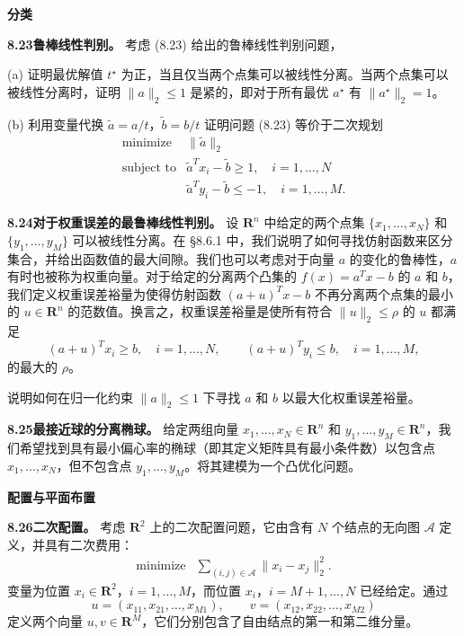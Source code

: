 \documentclass[UTF8, 12pt, fontset=fandol, oneside]{ctexart}
\begin{document}
\noindent\textbf{分类}

\noindent\textbf{8.23\quad 鲁棒线性判别。}
考虑 (8.23) 给出的鲁棒线性判别问题，

(a) 证明最优解值 $t^\star$ 为正，当且仅当两个点集可以被线性分离。当两个点集可以被线性分离时，证明 $\|a\|_2\leq 1$ 是紧的，即对于所有最优 $a^\star$ 有 $\|a^\star\|_2=1$。

(b) 利用变量代换 $\tilde a=a/t$，$\tilde b=b/t$ 证明问题 (8.23) 等价于二次规划
\[
\begin{array}{ll}
\mbox{minimize} & \|\tilde a\|_2\\
\mbox{subject to} & \tilde a^Tx_i-\tilde b\geq 1,\quad i=1,\ldots,N\\
& \tilde a^Ty_i-\tilde b\leq -1,\quad i=1,\ldots,M.
\end{array}
\]

\noindent\textbf{8.24\quad 对于权重误差的最鲁棒线性判别。}
设 $\mathbf{R}^n$ 中给定的两个点集 $\{x_1,\ldots,x_N\}$ 和 $\{y_1,\ldots,y_M\}$ 可以被线性分离。在 \S 8.6.1 中，我们说明了如何寻找仿射函数来区分集合，并给出函数值的最大间隙。我们也可以考虑对于向量 $a$ 的变化的鲁棒性，$a$ 有时也被称为权重向量。对于给定的分离两个凸集的 $f(x)=a^Tx-b$ 的 $a$ 和 $b$，我们定义权重误差裕量为使得仿射函数 $(a+u)^Tx-b$ 不再分离两个点集的最小的 $u\in\mathbf{R}^n$ 的范数值。换言之，权重误差裕量是使所有符合 $\|u\|_2\leq\rho$ 的 $u$ 都满足
\[
(a+u)^Tx_i\geq b,\quad i=1,\ldots,N,\qquad
(a+u)^Ty_i\leq b,\quad i=1,\ldots,M,
\]
的最大的 $\rho$。

说明如何在归一化约束 $\|a\|_2\leq 1$ 下寻找 $a$ 和 $b$ 以最大化权重误差裕量。

\noindent\textbf{8.25\quad 最接近球的分离椭球。}
给定两组向量 $x_1,\ldots,x_N\in\mathbf{R}^n$ 和 $y_1,\ldots,y_M\in\mathbf{R}^n$，我们希望找到具有最小偏心率的椭球（即其定义矩阵具有最小条件数）以包含点 $x_1,\ldots,x_N$，但不包含点 $y_1,\ldots,y_M$。将其建模为一个凸优化问题。

\noindent\textbf{配置与平面布置}

\noindent\textbf{8.26\quad 二次配置。}
考虑 $\mathbf{R}^2$ 上的二次配置问题，它由含有 $N$ 个结点的无向图 $\mathcal A$ 定义，并具有二次费用：
\[
\begin{array}{ll}
\mbox{minimize} & \displaystyle\sum_{(i,j)\in\mathcal A}\|x_i-x_j\|_2^2.
\end{array}
\]
变量为位置 $x_i\in\mathbf{R}^2$，$i=1,\ldots,M$，而位置 $x_i$，$i=M+1,\ldots,N$ 已经给定。通过
\[
u=(x_{11},x_{21},\ldots,x_{M1}),\qquad v=(x_{12},x_{22},\ldots,x_{M2})
\]
定义两个向量 $u,v\in\mathbf{R}^M$，它们分别包含了自由结点的第一和第二维分量。
\end{document}
